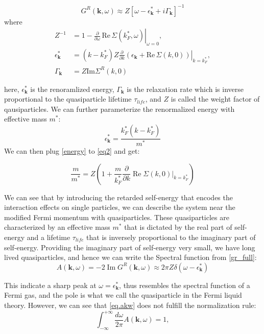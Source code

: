 \begin{equation}
\label{gr_full}
G^{R}(\mathbf{k}, \omega) \approx Z \left[ \omega - \epsilon^*_{\mathbf{k}} + i \Gamma_{\mathbf{k}} \right]^{-1}
\end{equation}
where
\begin{align} 
	Z^{-1} &= 1 - \left. \frac{\partial}{\partial \omega} \, \mathrm{Re} \, \Sigma (k^*_{F}, \omega) \right|_{\omega = 0}, 
	\\ 
	\label{eq2}
	\epsilon^*_{\mathbf{k}} &= (k - k^*_{F}) Z \left. \frac{\partial}{\partial k} \left( \epsilon_{\mathbf{k}} + \mathrm{Re} \, \Sigma ({k}, 0) \right) \right|_{k = k^*_{F}}, \\ 
	\label{gamma}
	\Gamma_{\mathbf{k}} &= Z \mathrm{Im} \Sigma^{R}({k}, 0) 
\end{align}

\noindent here, $\epsilon^*_{\mathbf{k}}$ is the renoramlized energy, $\Gamma_{\mathbf{k}}$ is the relaxation rate which is inverse proportional to the quasiparticle lifetime $\tau_{life}$, and $Z$ is called the weight factor of qausiparticles. We can further parameterize the renormalized energy with effective mass $m^*$: 
\begin{equation}\label{energy}
	\epsilon^*_{\mathbf{k}} = \frac{k^*_F(k-k^*_F)}{m^*}
\end{equation}
We can then plug \ref{energy} to \ref{eq2} and get: 

\begin{equation}
	\frac{m}{m^*} = Z(1 + \frac{m}{k^*_F}\frac{\partial}{\partial k}\operatorname{Re}\Sigma(k,0)|_{k = k^*_{F}})
\end{equation}

We can see that by introducing the retarded self-energy that encodes the interaction effects on single particles, we can describe the system near the modified Fermi momentum with quasiparticles. These quasiparticles are characterized by an effective mass $m^*$ that is dictated by the real part of self-energy and a lifetime $\tau_{life}$ that is inversely proportional to the imaginary part of self-energy. Providing the imaginary part of self-energy very small, we have long lived quasiparticles, and hence we can write the Spectral function from \ref{gr_full}:
\begin{equation}
	\label{eq.akw}
	A(\textbf{k},\omega) = -2\operatorname{Im}G^R(\textbf{k}, \omega) 
	\approx 2\pi Z\delta(\omega-\epsilon^*_\textbf{k}) 
\end{equation}

This indicate a sharp peak at $\omega=\epsilon^*_\textbf{k}$, thus resembles the spectral function of a Fermi gas, and the pole is what we call the quasiparticle in the Fermi liquid theory. However, we can see that \ref{eq.akw} does not fulfill the normalization rule: 
\begin{equation}
	\int_{-\infty}^{+\infty} \frac{d\omega}{2\pi} A(\textbf{k},\omega) = 1, 
\end{equation}

